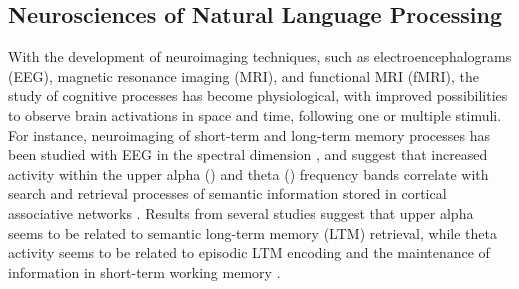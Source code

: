\subsection{Neurosciences of Natural Language Processing}
With the development of neuroimaging techniques, such as electroencephalograms (EEG), magnetic resonance imaging (MRI), and functional MRI (fMRI), the study of cognitive processes has become physiological, with improved possibilities to observe brain activations in space and time, following one or multiple stimuli. For instance, neuroimaging of short-term and long-term memory processes has been studied with EEG in the spectral dimension \cite{klimesch1999eeg,khader2011eeg}, and suggest that increased activity within the upper alpha () and theta () frequency bands correlate with search and retrieval processes of semantic information stored in cortical associative networks \cite{klimesch1996memory,klimesch1990alpha}. Results from several studies \cite{khader2011eeg} suggest that upper alpha seems to be related to semantic long-term memory (LTM) retrieval, while theta activity seems to be related to episodic LTM encoding \cite{} and the maintenance of information in short-term working memory \cite{}. 


